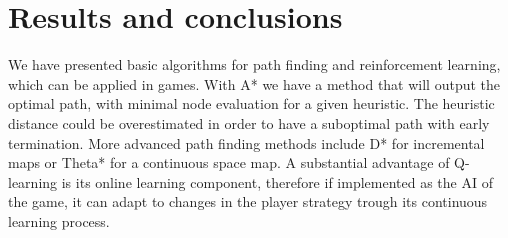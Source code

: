 \documentclass[12pt]{article}
\begin{document}
\section{Results and conclusions}

We have presented basic algorithms for path finding and reinforcement learning, which can be applied in games.
With A* we have a method that will output the optimal path, with minimal node evaluation for a given heuristic.
The heuristic distance could be overestimated in order to have a suboptimal path with early termination.
More advanced path finding methods include D*\cite{Stentz1993} for incremental maps or Theta*\cite{Nash2007} for a continuous space map.
A substantial advantage of Q-learning is its online learning component, therefore if implemented as the AI of the game, it can adapt to changes in the player strategy trough its continuous learning process.



\end{document}
